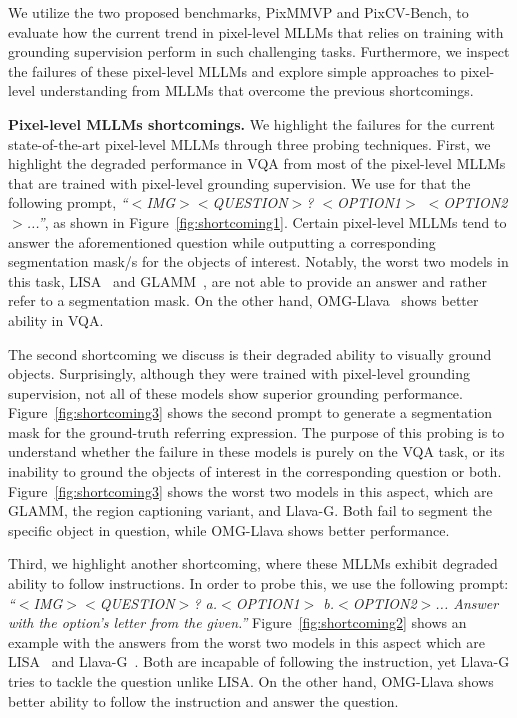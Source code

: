 We utilize the two proposed benchmarks, PixMMVP and PixCV-Bench, to evaluate how the current trend in pixel-level MLLMs that relies on training with grounding supervision perform in such challenging tasks. Furthermore, we inspect the failures of these pixel-level MLLMs and explore simple approaches to pixel-level understanding from MLLMs that overcome the previous shortcomings. %

\textbf{Pixel-level MLLMs shortcomings.} We highlight the failures for the current state-of-the-art pixel-level MLLMs through three probing techniques. First, we highlight the degraded performance in VQA from most of the pixel-level MLLMs that are trained with pixel-level grounding supervision. We use for that the following prompt, \textit{``$<$IMG$>$$<$QUESTION$>$? $<$OPTION1$>$ $<$OPTION2$>$...''}, as shown in Figure~\ref{fig:shortcoming1}. Certain pixel-level MLLMs tend to answer the aforementioned question while outputting a corresponding segmentation mask/s for the objects of interest. Notably, the worst two models in this task, LISA~\cite{lai2024lisa} and GLAMM~\cite{rasheed2024glamm}, are not able to provide an answer and rather refer to a segmentation mask. On the other hand, OMG-Llava~\cite{zhang2024omg} shows better ability in VQA.%

The second shortcoming we discuss is their degraded ability to visually ground objects. Surprisingly, although they were trained with pixel-level grounding supervision, not all of these models show superior grounding performance. Figure~\ref{fig:shortcoming3} shows the second prompt to generate a segmentation mask for the ground-truth referring expression. The purpose of this probing is to understand whether the failure in these models is purely on the VQA task, or its inability to ground the objects of interest in the corresponding question or both. Figure~\ref{fig:shortcoming3} shows the worst two models in this aspect, which are GLAMM, the region captioning variant, and Llava-G. Both fail to segment the specific object in question, while OMG-Llava shows better performance.

Third, we highlight another shortcoming, where these MLLMs exhibit degraded ability to follow instructions. In order to probe this, we use the following prompt: \textit{``$<$IMG$>$$<$QUESTION$>$? a.$<$OPTION1$>$ b.$<$OPTION2$>$... Answer with the option's letter from the given.''} Figure~\ref{fig:shortcoming2} shows an example with the answers from the worst two models in this aspect which are LISA~\cite{lai2024lisa} and Llava-G~\cite{zhang2025llava}. Both are incapable of following the instruction, yet Llava-G tries to tackle the question unlike LISA. On the other hand, OMG-Llava shows better ability to follow the instruction and answer the question. 

